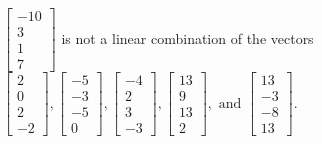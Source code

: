 \begin{exercise}
\begin{exerciseStatement}
  \end{exerciseStatement}
  \begin{exerciseAnswer}
   \(\left[\begin{array}{c}
-10 \\
3 \\
1 \\
7
\end{array}\right]\) 
  	 is not  
	a linear combination of the vectors \(\left[\begin{array}{c}
2 \\
0 \\
2 \\
-2
\end{array}\right] , \left[\begin{array}{c}
-5 \\
-3 \\
-5 \\
0
\end{array}\right] , \left[\begin{array}{c}
-4 \\
2 \\
3 \\
-3
\end{array}\right] , \left[\begin{array}{c}
13 \\
9 \\
13 \\
2
\end{array}\right] , \text{ and } \left[\begin{array}{c}
13 \\
-3 \\
-8 \\
13
\end{array}\right]\).

	
  


  \end{exerciseAnswer}
\end{exercise}